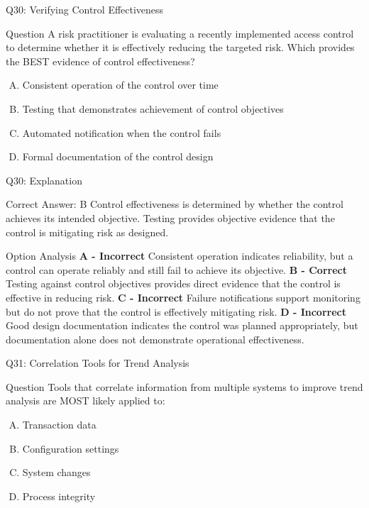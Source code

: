 \documentclass{beamer}
\begin{document}
	
	\begin{frame}{Q30: Verifying Control Effectiveness} \begin{block}{Question} A risk practitioner is evaluating a recently implemented access control to determine whether it is effectively reducing the targeted risk. Which provides the BEST evidence of control effectiveness? \end{block} \begin{enumerate}[(A)] \item Consistent operation of the control over time \item Testing that demonstrates achievement of control objectives \item Automated notification when the control fails \item Formal documentation of the control design \end{enumerate} \end{frame} \begin{frame}[shrink=10]{Q30: Explanation} \footnotesize \begin{block}{Correct Answer: B} Control effectiveness is determined by whether the control achieves its intended objective. Testing provides objective evidence that the control is mitigating risk as designed. \end{block} \begin{block}{Option Analysis} \textbf{A - Incorrect} Consistent operation indicates reliability, but a control can operate reliably and still fail to achieve its objective. \vspace{0.15cm} \textbf{B - Correct} Testing against control objectives provides direct evidence that the control is effective in reducing risk. \vspace{0.15cm} \textbf{C - Incorrect} Failure notifications support monitoring but do not prove that the control is effectively mitigating risk. \vspace{0.15cm} \textbf{D - Incorrect} Good design documentation indicates the control was planned appropriately, but documentation alone does not demonstrate operational effectiveness. \end{block} \end{frame}
	
	\begin{frame}{Q31: Correlation Tools for Trend Analysis}
		\begin{block}{Question}
			Tools that correlate information from multiple systems to improve trend analysis are MOST likely applied to:
		\end{block}
		\begin{enumerate}[(A)]
			\item Transaction data
			\item Configuration settings
			\item System changes
			\item Process integrity
		\end{enumerate}
	\end{frame}
	
\end{document}
